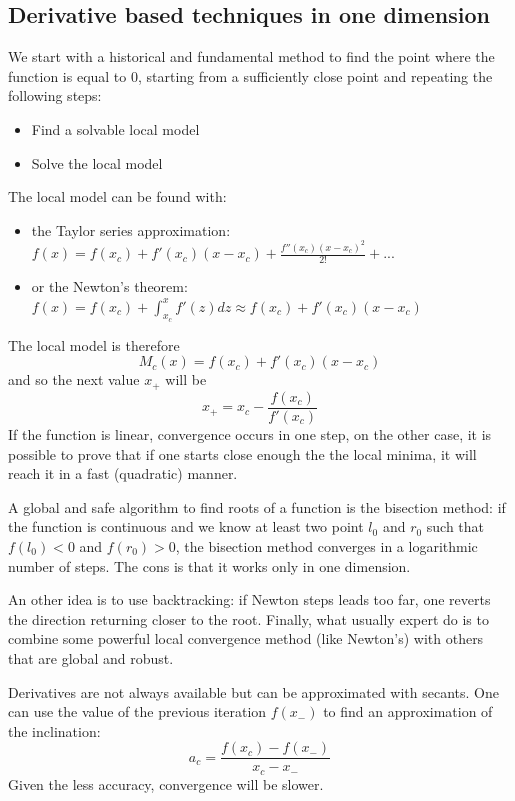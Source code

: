 \documentclass[10pt]{article}
\begin{document}
\subsection{Derivative based techniques in one dimension}
We start with a historical and fundamental method to find the point where the function is equal to 0, starting from a sufficiently close point and repeating the following steps:
\begin{itemize}
\item{Find a solvable local model}
\item{Solve the local model}
\end{itemize}
The local model can be found with:
\begin{itemize}
\item{the Taylor series approximation: $ f(x) = f(x_{c}) + f'(x_{c}) (x - x_{c}) + \frac{f''(x_{c}) (x-x_{c})^2}{2!} + ...$ }
\item{or the Newton's theorem: $ f(x) = f(x_{c}) + \int_{x_{c}}^{x} f'(z) dz \approx f(x_{c}) + f'(x_{c}) (x - x_{c}) $ }
\end{itemize}
The local model is therefore $$ M_{c}(x) = f(x_{c}) + f'(x_{c}) (x - x_{c}) $$ and so the next value $x_{+}$ will be $$ x_{+} = x_{c} - \frac{f(x_{c})}{f'(x_{c})} $$ 
If the function is linear, convergence occurs in one step, on the other case, it is possible to prove that if one starts close enough the the local minima, it will reach it in a fast (quadratic) manner.
\par
A global and safe algorithm to find roots of a function is the bisection method: if the function is continuous and we know at least two point $l_{0}$ and $r_{0}$ such that $f(l_{0}) < 0$ and $f(r_{0}) > 0$, the bisection method converges in a logarithmic number of steps. The cons is that it works only in one dimension.
\par
An other idea is to use backtracking: if Newton steps leads too far, one reverts the direction returning closer to the root. Finally, what usually expert do is to combine some powerful local convergence method (like Newton's) with others that are global and robust.
\par
Derivatives are not always available but can be approximated with secants. One can use the value of the previous iteration $f(x_{-})$ to find an approximation of the inclination: $$ a_{c} = \frac{f(x_{c}) - f(x_{-})}{x_{c} - x_{-}} $$ Given the less accuracy, convergence will be slower. 
\end{document}
